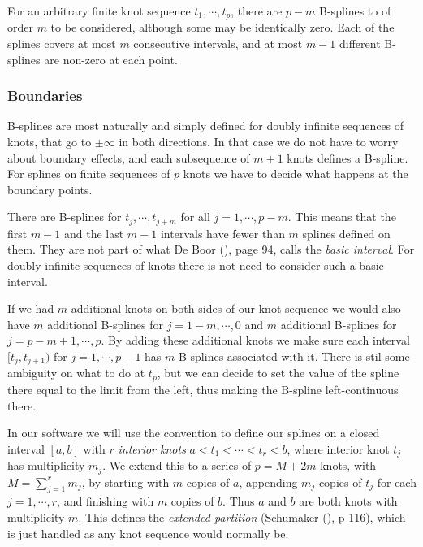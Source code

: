 \documentclass[
  12pt,
  letterpaper,
  DIV=11,
  numbers=noendperiod]{scrreprt}
\theoremstyle{remark}
\begin{document}
For an arbitrary finite knot sequence \(t_1,\cdots,t_p\), there are
\(p-m\) B-splines to of order \(m\) to be considered, although some may
be identically zero. Each of the splines covers at most \(m\)
consecutive intervals, and at most \(m-1\) different B-splines are
non-zero at each point.

\subsubsection{Boundaries}\label{mathbboundaries}

B-splines are most naturally and simply defined for doubly infinite
sequences of knots, that go to \(\pm\infty\) in both directions. In that
case we do not have to worry about boundary effects, and each
subsequence of \(m+1\) knots defines a B-spline. For splines on finite
sequences of \(p\) knots we have to decide what happens at the boundary
points.

There are B-splines for \(t_j,\cdots,t_{j+m}\) for all
\(j=1,\cdots,p-m\). This means that the first \(m-1\) and the last
\(m-1\) intervals have fewer than \(m\) splines defined on them. They
are not part of what De Boor (), page 94,
calls the \emph{basic interval}. For doubly infinite sequences of knots
there is not need to consider such a basic interval.

If we had \(m\) additional knots on both sides of our knot sequence we
would also have \(m\) additional B-splines for \(j=1-m,\cdots,0\) and
\(m\) additional B-splines for \(j=p-m+1,\cdots,p\). By adding these
additional knots we make sure each interval \([t_j,t_{j+1})\) for
\(j=1,\cdots,p-1\) has \(m\) B-splines associated with it. There is stil
some ambiguity on what to do at \(t_p\), but we can decide to set the
value of the spline there equal to the limit from the left, thus making
the B-spline left-continuous there.

In our software we will use the convention to define our splines on a
closed interval \([a,b]\) with \(r\) \emph{interior knots}
\(a<t_1<\cdots<t_r<b\), where interior knot \(t_j\) has multiplicity
\(m_j\). We extend this to a series of \(p=M+2m\) knots, with
\(M=\sum_{j=1}^r m_j\), by starting with \(m\) copies of \(a\),
appending \(m_j\) copies of \(t_j\) for each \(j=1,\cdots,r\), and
finishing with \(m\) copies of \(b\). Thus \(a\) and \(b\) are both
knots with multiplicity \(m\). This defines the \emph{extended
partition} (Schumaker (), p 116), which
is just handled as any knot sequence would normally be.
\end{document}
